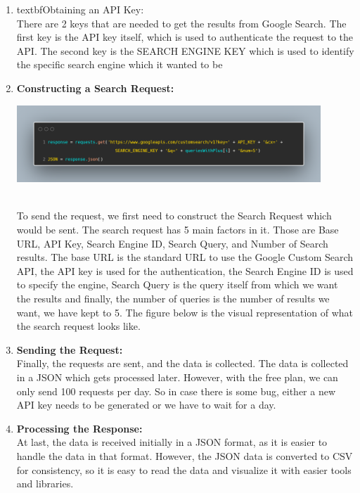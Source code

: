\documentclass[50pt]{usiinfbachelorproject}
\begin{document}
\begin{enumerate}
  \item textbf{Obtaining an API Key:} \\
  There are 2 keys that are needed to get the results from Google Search. The first key is the API key itself, which is used to authenticate the request to the API. The second key is the SEARCH ENGINE KEY which is used to identify the specific search engine which it wanted to be 
  \item \textbf{Constructing a Search Request:} \\
  \noindent
  \begin{minipage}{\linewidth}
  \centering
  \includegraphics[width=0.9\textwidth]{images/google-search-configuration.png}
  \label{fig:google-search-configuration}
  \end{minipage}
  \\
  To send the request, we first need to construct the Search Request which would be sent. The search request has 5 main factors in it. Those are Base URL, API Key, Search Engine ID, Search Query, and Number of Search results. The base URL is the standard URL to use the Google Custom Search API, the API key is used for the authentication, the Search Engine ID is used to specify the engine, Search Query is the query itself from which we want the results and finally, the number of queries is the number of results we want, we have kept to 5. The figure below is the visual representation of what the search request looks like.

  \item \textbf{Sending the Request:}\\
  Finally, the requests are sent, and the data is collected. The data is collected in a JSON which gets processed later. However, with the free plan, we can only send 100 requests per day. So in case there is some bug, either a new API key needs to be generated or we have to wait for a day.
  \item \textbf{Processing the Response:}\\
  At last, the data is received initially in a JSON format, as it is easier to handle the data in that format. However, the JSON data is converted to CSV for consistency, so it is easy to read the data and visualize it with easier tools and libraries.

\end{enumerate}
\end{document}
